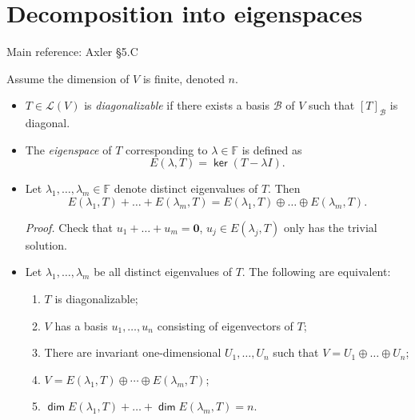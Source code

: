 \documentclass[11pt]{article}
\newcommand{\1}{\mathbf{1}}
\newcommand{\0}{\mathbf{0}}
\newcommand{\B}{\mathcal{B}}
\newcommand{\F}{\mathbb{F}}
\newcommand{\cL}{\mathcal{L}}
\DeclareMathOperator{\myker}{\mathsf{ker}}
\DeclareMathOperator{\mydim}{\mathsf{dim}}
\begin{document}
\clearpage
\section{Decomposition into eigenspaces}

Main reference:
Axler \S5.C


Assume the dimension of $V$ is finite, denoted $n$.


\begin{itemize}

\item

$T\in\mathcal{L}(V)$ is \emph{diagonalizable} if there exists a basis $\B$ of $V$ such that $[T]_{\B}$ is diagonal.

\item


The \emph{eigenspace} of $T$ corresponding to $\lambda \in \F$ is defined as
\[
E(\lambda,T) = \myker(T - \lambda I).
\]

\item


Let $\lambda_1,\dots,\lambda_m \in \F$ denote distinct eigenvalues of $T$.
Then
\[
E(\lambda_1,T) + \dots + E(\lambda_m,T)
=
E(\lambda_1,T) \oplus \dots \oplus E(\lambda_m,T)
.
\]

\emph{Proof.}
Check that $u_1 + \dots + u_m = \0$, $ u_j \in E(\lambda_j,T) $ only has the trivial solution.


\item

Let  $\lambda_1,\dots,\lambda_m$ be all distinct eigenvalues of $T$. The following are equivalent: 

\begin{enumerate}
\item $T$ is diagonalizable;
\item $V$ has a basis $u_1,\dots,u_n$ consisting of eigenvectors of $T$;
\item There are invariant one-dimensional $U_1,\dots,U_n$ such that $V = U_1 \oplus \dots \oplus U_n$;
\item $V= E(\lambda_1,T) \oplus \cdots \oplus E(\lambda_m,T)$;
\item $\mydim E(\lambda_1,T) + \dots + \mydim E(\lambda_m,T) = n$.
\end{enumerate}


\end{itemize}
\end{document}

